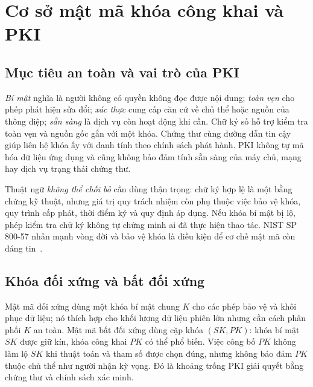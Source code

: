 \chapter{Cơ sở mật mã khóa công khai và PKI}
\label{chap:crypto}

\section{Mục tiêu an toàn và vai trò của PKI}
\emph{Bí mật} nghĩa là người không có quyền không đọc được nội dung; \emph{toàn vẹn} cho phép phát hiện sửa đổi; \emph{xác thực} cung cấp căn cứ về chủ thể hoặc nguồn của thông điệp; \emph{sẵn sàng} là dịch vụ còn hoạt động khi cần. Chữ ký số hỗ trợ kiểm tra toàn vẹn và nguồn gốc gắn với một khóa. Chứng thư cùng đường dẫn tin cậy giúp liên hệ khóa ấy với danh tính theo chính sách phát hành. PKI không tự mã hóa dữ liệu ứng dụng và cũng không bảo đảm tính sẵn sàng của máy chủ, mạng hay dịch vụ trạng thái chứng thư.

Thuật ngữ \emph{không thể chối bỏ} cần dùng thận trọng: chữ ký hợp lệ là một bằng chứng kỹ thuật, nhưng giá trị quy trách nhiệm còn phụ thuộc việc bảo vệ khóa, quy trình cấp phát, thời điểm ký và quy định áp dụng. Nếu khóa bí mật bị lộ, phép kiểm tra chữ ký không tự chứng minh ai đã thực hiện thao tác. NIST SP 800-57 nhấn mạnh vòng đời và bảo vệ khóa là điều kiện để cơ chế mật mã còn đáng tin~\cite{nist80057}.

\section{Khóa đối xứng và bất đối xứng}
Mật mã đối xứng dùng một khóa bí mật chung $K$ cho các phép bảo vệ và khôi phục dữ liệu; nó thích hợp cho khối lượng dữ liệu phiên lớn nhưng cần cách phân phối $K$ an toàn. Mật mã bất đối xứng dùng cặp khóa $(SK,PK)$: khóa bí mật $SK$ được giữ kín, khóa công khai $PK$ có thể phổ biến. Việc công bố $PK$ không làm lộ $SK$ khi thuật toán và tham số được chọn đúng, nhưng không bảo đảm $PK$ thuộc chủ thể như người nhận kỳ vọng. Đó là khoảng trống PKI giải quyết bằng chứng thư và chính sách xác minh.

